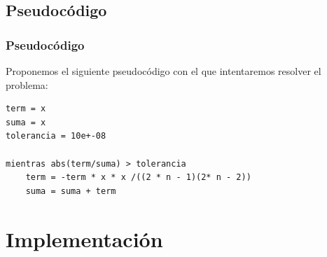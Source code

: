 \subsection*{Pseudocódigo}
\begin{frame}[fragile]
\frametitle{Pseudocódigo}
Proponemos el siguiente pseudocódigo con el que intentaremos resolver el problema:
\begin{lstlisting}
term = x
suma = x
tolerancia = 10e+-08

mientras abs(term/suma) > tolerancia
    term = -term * x * x /((2 * n - 1)(2* n - 2))
    suma = suma + term
\end{lstlisting}
\end{frame}
\section{Implementación}
